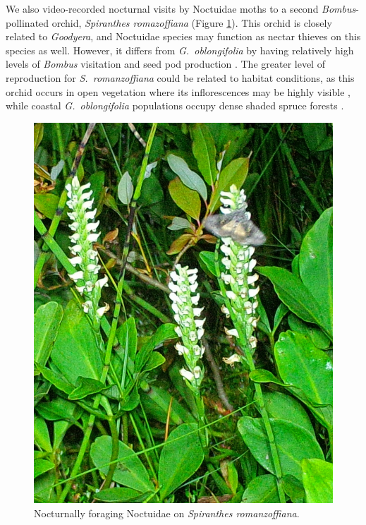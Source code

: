 \begin{multicols}{2}
We also video-recorded nocturnal visits by Noctuidae moths to a second
\emph{Bombus}-pollinated orchid, \emph{Spiranthes romazoffiana} (Figure
\ref{Spiranthes_romazoffiana_Noctuidae}). This orchid is closely related to \emph{Goodyera}, and Noctuidae
species may function as nectar thieves on this species as well. However,
it differs from \emph{G.\ oblongifolia} by having relatively high levels
of \emph{Bombus} visitation and seed pod production \citep{LarsonLarson1987}. The greater level of reproduction for \emph{S.\ romanzoffiana} could be related to habitat conditions, as this
orchid occurs in open vegetation where its inflorescences may be highly
visible \citep{LarsonLarson1990}, while coastal \emph{G.\ oblongifolia} populations occupy dense shaded spruce forests
\citep{Ackerman1975}.

\begin{figure}[H]
\begin{center}
\vspace{2mm}
\includegraphics[width=\textwidth]{img/Spiranthes_romazoffiana_Noctuidae.jpg}
\caption{Nocturnally foraging Noctuidae on \emph{Spiranthes romanzoffiana}.}
\label{Spiranthes_romazoffiana_Noctuidae}
\end{center}
\end{figure}




\end{multicols}
